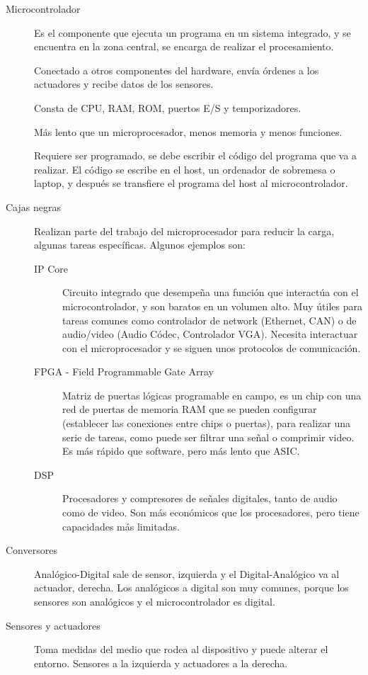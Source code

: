 \documentclass[12pt, twoside, openright]{report} %
\begin{document}
\begin{description}
	\item[Microcontrolador] Es el componente que ejecuta un programa en un sistema integrado, y se encuentra en la zona central, se encarga de realizar el procesamiento.

	      Conectado a otros componentes del hardware, envía órdenes a los actuadores y recibe datos de los sensores.

	      Consta de CPU, RAM, ROM, puertos E/S y temporizadores.

	      Más lento que un microprocesador, menos memoria y menos funciones.

	      Requiere ser programado, se debe escribir el código del programa que va a realizar. El código se escribe en el host, un ordenador de sobremesa o laptop, y después se transfiere el programa del host al microcontrolador.
	\item[Cajas negras] Realizan parte del trabajo del microprocesador para reducir la carga, algunas tareas específicas. Algunos ejemplos son:
	      \begin{description}
		      \item[IP Core] Circuito integrado que desempeña una función que interactúa con el microcontrolador, y son baratos en un volumen alto. Muy útiles para tareas comunes como controlador de network (Ethernet, CAN)  o de audio/video (Audio Códec, Controlador VGA). Necesita interactuar con el microprocesador y se siguen unos protocolos de comunicación.

		      \item[FPGA - Field Programmable Gate Array] Matriz de puertas lógicas programable en campo, es un chip con una red de puertas de memoria RAM que se pueden configurar (establecer las conexiones entre chips o puertas), para realizar una serie de tareas, como puede ser filtrar una señal o comprimir video. Es más rápido que software, pero más lento que ASIC.

		      \item[DSP] Procesadores y compresores de señales digitales, tanto de audio como de video. Son más económicos que los procesadores, pero tiene capacidades más limitadas.

	      \end{description}
	\item[Conversores] Analógico-Digital sale de sensor, izquierda y el Digital-Analógico va al actuador, derecha. Los analógicos a digital son muy comunes, porque los sensores son analógicos y el microcontrolador es digital.
	\item[Sensores y actuadores] Toma medidas del medio que rodea al dispositivo y puede alterar el entorno. Sensores a la izquierda y actuadores a la derecha.
\end{description}
\end{document}
